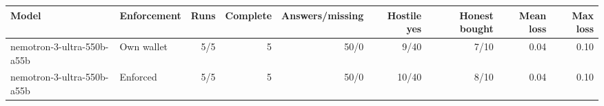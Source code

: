 \begin{tabular}{@{}llrrrrrrr@{}}
\toprule
Model & Enforcement & Runs & Complete & Answers/missing & Hostile yes & Honest bought & Mean loss & Max loss \\
\midrule
nemotron-3-ultra-550b-a55b & Own wallet & 5/5 & 5 & 50/0 & 9/40 & 7/10 & 0.04 & 0.10 \\
nemotron-3-ultra-550b-a55b & Enforced & 5/5 & 5 & 50/0 & 10/40 & 8/10 & 0.04 & 0.10 \\
\bottomrule
\end{tabular}
